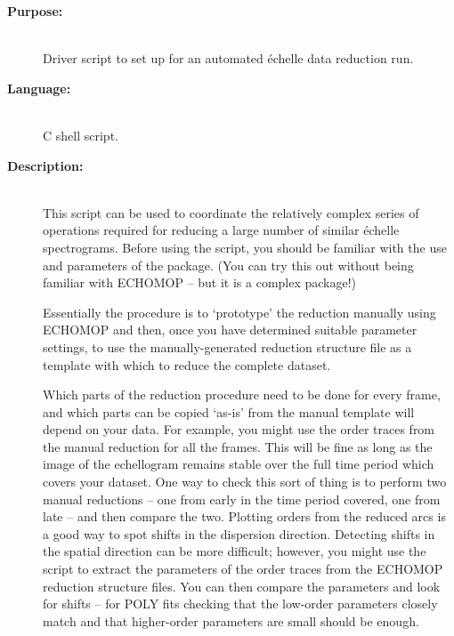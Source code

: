 \documentclass[twoside,11pt]{starlink}
\providecommand{\scspec}[2]{#1}
\begin{document}
\begin{description}

\item [\textbf{Purpose:}] \mbox{} \\
     Driver script to set up for an automated \'{e}chelle data reduction run.

\item [\textbf{Language:}] \mbox{} \\
     C shell script.

\item [\textbf{Description:}] \mbox{} \\
     This script can be used to coordinate the relatively complex
     series of operations required for reducing a large number of
     similar \'{e}chelle spectrograms.  Before using the script, you
     should be familiar with the use and parameters of the
     package.  (You can try this out without being familiar with
     ECHOMOP \scspec{--}{-} but it is a complex package!)

     Essentially the procedure is to `prototype' the reduction
     manually using ECHOMOP and then, once you have determined
     suitable parameter settings, to use the manually-generated
     reduction structure file as a template with which to reduce
     the complete dataset.

     Which parts of the reduction procedure need to be done for every
     frame, and which parts can be copied `as-is' from the manual
     template will depend on your data.  For example, you might
     use the order traces from the manual reduction for all the
     frames.  This will be fine as long as the image of the echellogram
     remains stable over the full time period which covers your dataset.
     One way to check this sort of thing is to perform two manual
     reductions \scspec{--}{-} one from early in the time period covered,
     one from late \scspec{--}{-} and then compare the two.
     Plotting orders from the reduced
     arcs is a good way to spot shifts in the dispersion direction.
     Detecting shifts in the spatial direction can be more difficult;
     however, you might use the 
     script to extract the
     parameters of the order traces from the ECHOMOP reduction structure
     files.  You can then compare the parameters and look for shifts
     \scspec{--}{-} for POLY fits checking that the low-order parameters
     closely match and that higher-order parameters are small should be enough.


\end{description}
\end{document}

